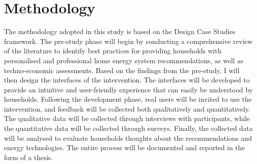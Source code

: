 \chapter{Methodology} 

The methodology adopted in this study is based on the Design Case Studies framework. 
The pre-study phase will begin by conducting a comprehensive review of the literature to identify best practices for providing households with personalised and professional home energy system recommendations, as well as techno-economic assessments.
Based on the findings from the pre-study, I will then design the interfaces of the intervention. 
The interfaces will be developed to provide an intuitive and user-friendly experience that can easily be understood by households. 
Following the development phase, real users will be invited to use the intervention, and feedback will be collected both qualitatively and quantitatively. 
The qualitative data will be collected through interviews with participants, while the quantitative data will be collected through surveys. 
Finally, the collected data will be analysed to evaluate households thoughts about the recommendations and energy technologies. 
The entire process will be documented and reported in the form of a thesis. 
